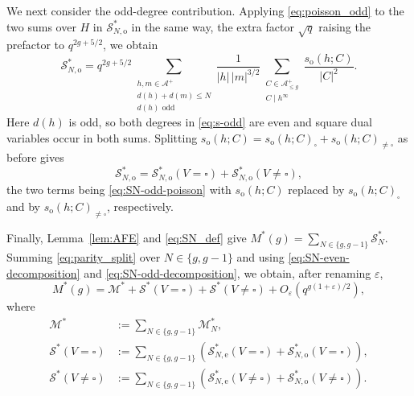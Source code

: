 \documentclass[a4paper,reqno]{amsart}
\numberwithin{equation}{section}
\theoremstyle{remark}
\theoremstyle{definition}
\newcommand{\A}{\mathcal{A}}
\begin{document}
We next consider the odd-degree contribution. Applying
\eqref{eq:poisson_odd} to the two sums over $H$ in
$\mathcal S_{N,\mathrm o}^*$ in the same way, the extra factor $\sqrt q$
raising the prefactor to $q^{2g+5/2}$, we obtain
\begin{equation}\label{eq:SN-odd-poisson}
\mathcal S_{N,\mathrm o}^*
=
q^{2g+5/2}
\sum_{\substack{h,m\in\A^+\\ d(h)+d(m)\le N\\ d(h)\text{ odd}}}
\frac{1}{|h|\,|m|^{3/2}}
\sum_{\substack{C\in\A_{\le g}^+\\C\mid h^\infty}}
\frac{s_{\mathrm o}(h;C)}{|C|^2}.
\end{equation}
Here $d(h)$ is odd, so both degrees in \eqref{eq:s-odd} are even and square
dual variables occur in both sums. Splitting
$s_{\mathrm o}(h;C)=s_{\mathrm o}(h;C)_{\square}+s_{\mathrm o}(h;C)_{\ne\square}$
as before gives
\begin{equation}\label{eq:SN-odd-decomposition}
\mathcal S_{N,\mathrm o}^*
=
\mathcal S_{N,\mathrm o}^*(V=\square)
+
\mathcal S_{N,\mathrm o}^*(V\ne\square),
\end{equation}
the two terms being \eqref{eq:SN-odd-poisson} with $s_{\mathrm o}(h;C)$
replaced by $s_{\mathrm o}(h;C)_{\square}$ and by
$s_{\mathrm o}(h;C)_{\ne\square}$, respectively.

Finally, Lemma~\ref{lem:AFE} and \eqref{eq:SN_def} give
$M^*(g) = \sum_{N\in\{g,g-1\}}\mathcal S_N^*$.
Summing \eqref{eq:parity_split} over $N\in\{g,g-1\}$ and using
\eqref{eq:SN-even-decomposition} and
\eqref{eq:SN-odd-decomposition}, we obtain, after renaming
$\varepsilon$,
\begin{equation}\label{eq:Mstar-decomposition}
M^*(g)
=
\mathcal M^*
+
\mathcal S^*(V=\square)
+
\mathcal S^*(V\ne\square)
+
O_\varepsilon\!\left(q^{g(1+\varepsilon)/2}\right),
\end{equation}
where
\begin{align}
\mathcal M^*
&:=
\sum_{N\in\{g,g-1\}}\mathcal M_N^*,   \label{eq:Mstar-zero}  \\
\mathcal S^*(V=\square)
&:=
\sum_{N\in\{g,g-1\}}
\left(
\mathcal S_{N,\mathrm e}^*(V=\square)
+
\mathcal S_{N,\mathrm o}^*(V=\square)
\right), \label{eq:Mstar-square} \\
\mathcal S^*(V\ne\square)
&:=
\sum_{N\in\{g,g-1\}}
\left(
\mathcal S_{N,\mathrm e}^*(V\ne\square)
+
\mathcal S_{N,\mathrm o}^*(V\ne\square)
\right). \label{eq:Mstar-nonsquare}
\end{align}
\end{document}
